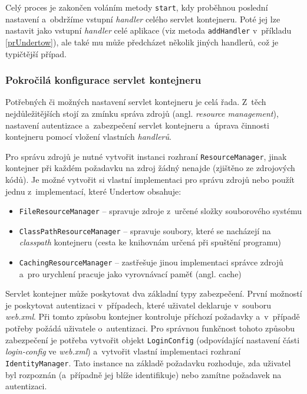                 Celý proces je zakončen voláním metody \texttt{start}, kdy proběhnou poslední nastavení a~obdržíme 
                vstupní \emph{handler} celého servlet kontejneru.
                Poté jej lze nastavit jako vstupní \emph{handler} celé aplikace
                (viz metoda \texttt{addHandler} v~příkladu \ref{prUndertow}), ale také mu může předcházet několik jiných handlerů,
                což je typičtější případ.


            \subsubsection{Pokročilá konfigurace servlet kontejneru}
                Potřebných či možných nastavení servlet kontejneru je celá řada. Z~těch nejdůležitějších stojí za zmínku 
                správa zdrojů (angl. \emph{resource management}), nastavení autentizace a~zabezpečení servlet kontejneru
                a~úprava činnosti kontejneru pomocí vložení vlastních \emph{handlerů}.

                Pro správu zdrojů je nutné vytvořit instanci rozhraní \texttt{ResourceManager}, jinak kontejner při 
                každém požadavku na zdroj žádný nenajde (zjištěno ze zdrojových kódů). Je možné vytvořit si vlastní
                implementaci pro správu zdrojů nebo použít jednu z~implementací, které Undertow obsahuje:

                \begin{itemize}
                    \item \texttt{FileResourceManager} -- spravuje zdroje z~určené složky souborového systému
                    \item \texttt{ClassPathResourceManager}  -- spravuje soubory, které se nacházejí na \emph{classpath} kontejneru 
                        (cesta ke knihovnám určená při spuštění programu)
                    \item \texttt{CachingResourceManager} -- zastřešuje jinou implementaci správce zdrojů a~pro
                        urychlení pracuje jako vyrovnávací paměť (angl. cache)
                \end{itemize}

                Servlet kontejner může poskytovat dva základní typy zabezpečení. 
                První možností je poskytovat autentizaci v~případech, které uživatel deklaruje v~souboru
                \emph{web.xml}. Při tomto způsobu kontejner kontroluje příchozí požadavky a~v~případě
                potřeby požádá uživatele o~autentizaci. Pro správnou funkčnost tohoto způsobu zabezpečení
                je potřeba vytvořit objekt \texttt{LoginConfig} \cite{undertowServletSecurity} (odpovídající
                nastavení části \emph{login-config} ve \emph{web.xml}) a~vytvořit vlastní implementaci
                rozhraní \texttt{IdentityManager}. Tato instance na základě požadavku rozhoduje, zda
                uživatel byl rozpoznán (a~případně jej blíže identifikuje) nebo zamítne požadavek na autentizaci.
                
